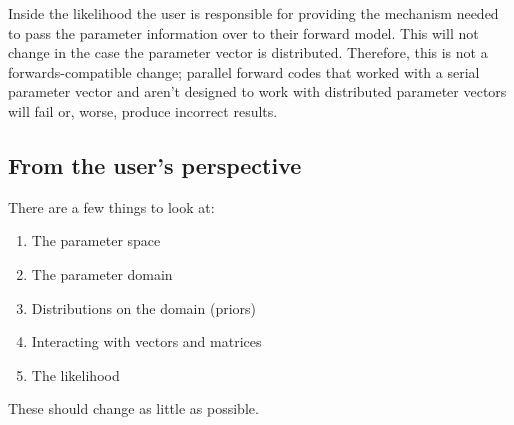 \documentclass{article}
\begin{document}
\def\parameter#1{
  \begin{scope}
    \node[vector, fill=green!40, right=of #1.west, xshift=0.11cm] (piece0) {};
    \node[vector, fill=yellow!40, right=of piece0.east, node distance=0cm] (piece1) {};
    \node[vector, fill=red!40, right=of piece1.east, node distance=0cm] (piece2) {};
  \end{scope}
}

\begin{center}
\end{center}

Inside the likelihood the user is responsible for providing the mechanism
needed to pass the parameter information over to their forward model.  This
will not change in the case the parameter vector is distributed.  Therefore,
this is not a forwards-compatible change; parallel forward codes that worked
with a serial parameter vector and aren't designed to work with distributed
parameter vectors will fail or, worse, produce incorrect results.

\subsection{From the user's perspective}

There are a few things to look at:
\begin{enumerate}
  \item The parameter space
  \item The parameter domain
  \item Distributions on the domain (priors)
  \item Interacting with vectors and matrices
  \item The likelihood
\end{enumerate}
These should change as little as possible.
\end{document}

